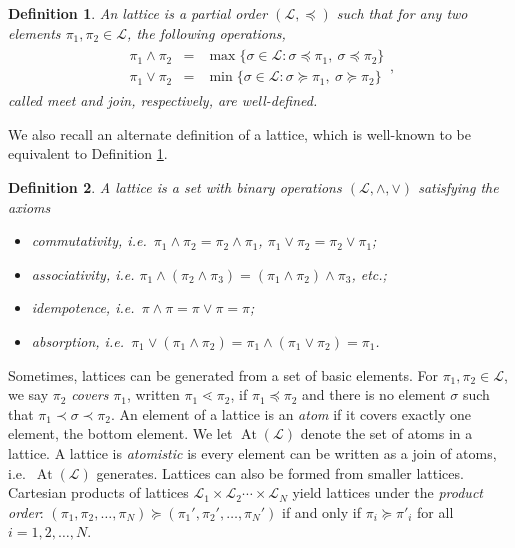 \documentclass[conference]{ieeeconf}
\renewcommand{\L}{\mathcal{L}}
\newcommand{\join}{\vee}
\newcommand{\meet}{\wedge}
\DeclareMathOperator{\Atoms}{At}
\newtheorem{definition}{Definition}
\begin{document}
\begin{definition} \label{def:lattice}
    An \emph{lattice} is a partial order $(\L, \preceq)$ such that for any two elements $\pi_1, \pi_2 \in \L$, the following operations,
    \begin{align*}
        \begin{aligned}
        \pi_1 \meet \pi_2 &=& \max\{ \sigma \in \L: \sigma \preceq \pi_1,~\sigma \preceq \pi_2 \} \\
        \pi_1 \join \pi_2 &=& \min\{ \sigma \in \L: \sigma \succeq \pi_1,~\sigma \succeq \pi_2 \}        
        \end{aligned},
    \end{align*}
    called \emph{meet} and \emph{join}, respectively, are well-defined. 
\end{definition}

We also recall an alternate definition of a lattice, which is well-known \cite{roman} to be equivalent to Definition \ref{def:lattice}.

\begin{definition} \label{def:lattice-axiom}
    A \emph{lattice} is a set with binary operations $(\L, \meet, \join)$ satisfying the axioms
    \begin{itemize}
        \item[-] \emph{commutativity}, i.e.~$\pi_1 \meet \pi_2 = \pi_2 \meet \pi_1$, $\pi_1 \join \pi_2 = \pi_2 \join \pi_1$;
        \item[-] \emph{associativity}, i.e. {\small $\pi_1 \meet (\pi_2 \meet \pi_3) = (\pi_1 \meet \pi_2) \meet \pi_3$}, etc.;
        \item[-] \emph{idempotence}, i.e.~$\pi \meet \pi = \pi \join \pi =  \pi$;
        \item[-] \emph{absorption}, i.e.~$\pi_1 \join \left( \pi_1 \meet \pi_2 \right) = \pi_1 \meet \left( \pi_1 \join \pi_2 \right) = \pi_1$.
    \end{itemize}
\end{definition}

Sometimes, lattices can be generated from a set of basic elements. For $\pi_1, \pi_2 \in \L$, we say $\pi_2$ \emph{covers} $\pi_1$, written $\pi_1 \lessdot \pi_2$, if $\pi_1 \preceq \pi_2$ and there is no element $\sigma$ such that $\pi_1 \prec \sigma \prec \pi_2$. An element of a lattice is an \emph{atom} if it covers exactly one element, the bottom element. We let $\Atoms(\L)$ denote the set of atoms in a lattice. A lattice is \emph{atomistic} is every element can be written as a join of atoms, i.e.~$\Atoms(\L)$ generates. Lattices can also be formed from smaller lattices. Cartesian products of lattices $\L_1 \times \L_2 \cdots \times \L_N$ yield lattices under the \emph{product order}: $(\pi_1, \pi_2, \dots, \pi_N) \succeq (\pi_1', \pi_2', \dots, \pi_N')$ if and only if $\pi_i \succeq \pi'_i$ for all $i = 1,2,\dots, N$.
\end{document}
